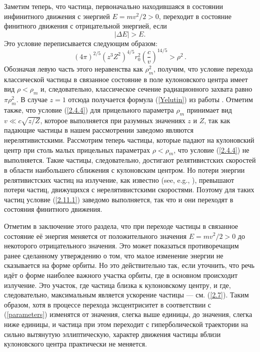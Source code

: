 \documentclass{SovJurn/JETPL}
\begin{document}
Заметим теперь, что частица, первоначально находившаяся в состоянии инфинитного движения с энергией $E=mv^2/2>0$, переходит в состояние финитного движения с отрицательной энергией, если
\begin{equation}
\label{2.11.1}
|\Delta E|>E.
\end{equation}
Это условие переписывается следующим образом: 
\begin{equation}
\label{2.11.2}
(4\pi)^{2/5}(z^3Z^2)^{4/5}r_0^2\left(\frac{c}{v}\right)^{14/5}>\rho^2\,.
\end{equation}
Обозначая левую часть этого неравенства как $\rho_m^2$, получим, что условие перехода классической частицы в связанное состояние в поле кулоновского центра имеет вид $\rho<\rho_m$ и, следовательно, классическое сечение радиационного захвата равно $\pi\rho_m^2$. В случае $z=1$ отсюда получается формула (\ref{Yelutin}) из работы \cite{elutin}. Отметим также, что условие (\ref{2.4.4}) для прицельного параметра $\rho_m$ принимает вид $v\ll c\sqrt{z/Z}$, которое выполняется при разумных значениях $z$ и $Z$, так как падающие частицы в нашем рассмотрении заведомо являются нерелятивистскими. Рассмотрим теперь частицы, которые падают на кулоновский центр при столь малых прицельных параметрах $\rho<\rho_m$, что условие (\ref{2.4.4}) не выполняется. Такие частицы, следовательно, достигают релятивистских скоростей в области наибольшего сближения с кулоновским центром. Но потери энергии релятивистских частиц на излучение, как известно (see, e.g., \cite{landau1975classical}), превышают потери частиц, движущихся с нерелятивистскими скоростями. Поэтому для таких частиц условие (\ref{2.11.1}) заведомо выполняется, так что и они переходят в состояния финитного движения.

Отметим в заключение этого раздела, что при переходе частицы в связанное состояние её энергия меняется от положительного значения $E=mv^2/2>0$ до некоторого отрицательного значения. Это может показаться противоречащим ранее сделанному утверждению о том, что  малое изменение энергии не сказывается на форме орбиты. Но это действительно так, если уточнить, что речь идёт о форме наиболее важного участка орбиты, где в основном происходит излучение. Это участок, где частица близка к кулоновскому центру, и где, следовательно, максимальным является ускорение частицы --- см. (\ref{2.7}). Таким образом, хотя в процессе перехода эксцентриситет в соответствии с (\ref{parameters}) изменятся от значения, слегка выше единицы, до значения, слегка ниже единицы, и частица при этом переходит с гиперболической траектории на сильно вытянутую эллиптическую, характер движения частицы вблизи кулоновского центра практически не меняется.
 
\end{document}
